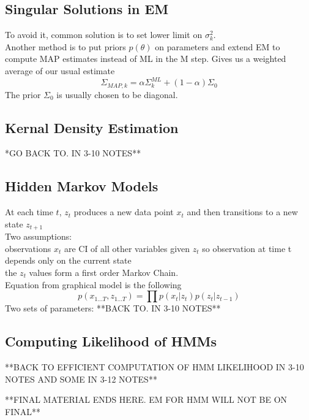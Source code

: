\documentclass[11pt,psfig]{article}
\begin{document}
\subsection*{Singular Solutions in EM}

To avoid it, common solution is to set lower limit on $\sigma_k^2$.\\
Another method is to put priors $p(\theta)$ on parameters and extend EM to compute MAP estimates instead of ML in the M step. Gives us a weighted average of our usual estimate
\[
\Sigma_{MAP,k} = \alpha \Sigma_k^{ML} + (1-\alpha)\Sigma_0
\]
The prior $\Sigma_0$ is usually chosen to be diagonal. 

\subsection*{Kernal Density Estimation}

*GO BACK TO. IN 3-10 NOTES**

\subsection*{Hidden Markov Models}

At each time $t$, $z_t$ produces a new data point $x_t$ and then transitions to a new state $z_{t+1}$\\
Two assumptions:
\\
observations $x_t$ are CI of all other variables given $z_t$ so observation at time t depends only on the current state
\\
the $z_t$ values form a first order Markov Chain.\\
Equation from graphical model is the following
\[
p(x_{1...T},z_{1...T}) = \prod p(x_t|z_t)p(z_t|z_{t-1})
\]
Two sets of parameters:
**BACK TO. IN 3-10 NOTES**
\\

\subsection*{Computing Likelihood of HMMs}

**BACK TO EFFICIENT COMPUTATION OF HMM LIKELIHOOD IN 3-10 NOTES AND SOME IN 3-12 NOTES**

**FINAL MATERIAL ENDS HERE. EM FOR HMM WILL NOT BE ON FINAL**
\end{document}
